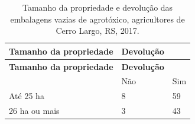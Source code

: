\documentclass[12pt,brazil,]{book}
\begin{document}
\begin{longtable}[]{@{}lll@{}}
\caption{\label{tab:tamprop1}Tamanho da propriedade e devolução das
embalagens vazias de agrotóxico, agricultores de Cerro Largo, RS,
2017.}\tabularnewline
\toprule
\begin{minipage}[b]{0.35\columnwidth}\raggedright
\textbf{Tamanho da propriedade}\strut
\end{minipage} & \begin{minipage}[b]{0.34\columnwidth}\raggedright
\textbf{Devolução}\strut
\end{minipage} & \begin{minipage}[b]{0.14\columnwidth}\raggedright
\strut
\end{minipage}\tabularnewline
\midrule
\endfirsthead
\toprule
\begin{minipage}[b]{0.35\columnwidth}\raggedright
\textbf{Tamanho da propriedade}\strut
\end{minipage} & \begin{minipage}[b]{0.34\columnwidth}\raggedright
\textbf{Devolução}\strut
\end{minipage} & \begin{minipage}[b]{0.14\columnwidth}\raggedright
\strut
\end{minipage}\tabularnewline
\midrule
\endhead
\begin{minipage}[t]{0.35\columnwidth}\raggedright
\strut
\end{minipage} & \begin{minipage}[t]{0.34\columnwidth}\raggedright
Não\strut
\end{minipage} & \begin{minipage}[t]{0.14\columnwidth}\raggedright
Sim\strut
\end{minipage}\tabularnewline
\begin{minipage}[t]{0.35\columnwidth}\raggedright
Até 25 ha\strut
\end{minipage} & \begin{minipage}[t]{0.34\columnwidth}\raggedright
8\strut
\end{minipage} & \begin{minipage}[t]{0.14\columnwidth}\raggedright
59\strut
\end{minipage}\tabularnewline
\begin{minipage}[t]{0.35\columnwidth}\raggedright
26 ha ou mais\strut
\end{minipage} & \begin{minipage}[t]{0.34\columnwidth}\raggedright
3\strut
\end{minipage} & \begin{minipage}[t]{0.14\columnwidth}\raggedright
43\strut
\end{minipage}\tabularnewline
\bottomrule
\end{longtable}
\end{document}
